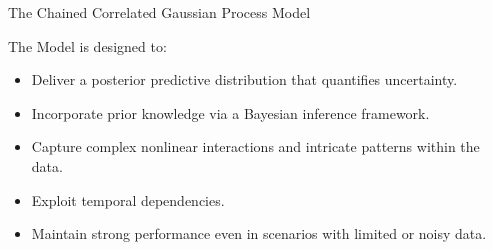 \documentclass[spanish]{beamer}
\begin{document}
\begin{frame}{The Chained Correlated Gaussian Process Model}
	\begin{block}{}
		The Model is designed to:
		\begin{itemize}[<+->]
			\item Deliver a posterior predictive distribution that quantifies uncertainty.
			\item Incorporate prior knowledge via a Bayesian inference framework.
			\item Capture complex nonlinear interactions and intricate patterns within the data.
			\item Exploit temporal dependencies.
			\item Maintain strong performance even in scenarios with limited or noisy data.
		\end{itemize}
	\end{block}
\end{frame}
\end{document}
